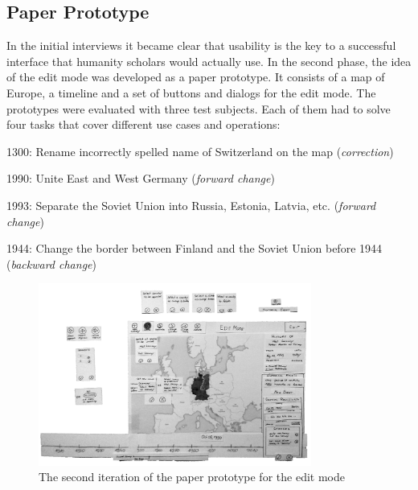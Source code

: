 

\subsection{Paper Prototype} %
\label{sub:paper_prototype}

In the initial interviews it became clear that usability is the key to a successful interface that humanity scholars would actually use. In the second phase, the idea of the edit mode was developed as a paper prototype. It consists of a map of Europe, a timeline and a set of buttons and dialogs for the edit mode. The prototypes were evaluated with three test subjects. Each of them had to solve four tasks that cover different use cases and operations:
\begin{compactenum}
  \item 1300: Rename incorrectly spelled name of Switzerland on the map (\emph{correction})
  \item 1990: Unite East and West Germany (\emph{forward change})
  \item 1993: Separate the Soviet Union into Russia, Estonia, Latvia, etc. (\emph{forward change})
  \item 1944: Change the border between Finland and the Soviet Union before 1944 (\emph{backward change})
\end{compactenum}

\begin{figure}[ht]
  \centering
  \includegraphics[width=0.8\textwidth]{graphics/development/user_interface_design_process/paper_prototype_2.png}
\caption{The second iteration of the paper prototype for the edit mode}
\label{fig:paper_prototypes}
\end{figure}

